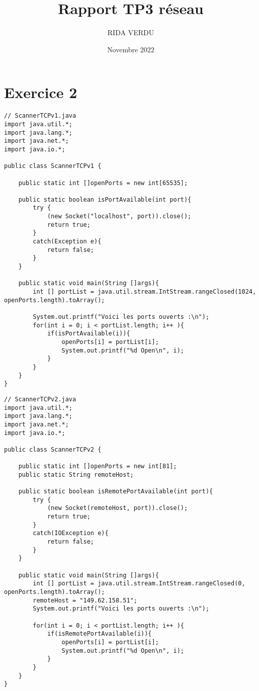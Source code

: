 \documentclass{article}
\title{Rapport TP3 réseau}
\author{RIDA VERDU}
\date{Novembre 2022}
\begin{document}
\maketitle

\section*{Exercice 2}
\begin{lstlisting}
// ScannerTCPv1.java
import java.util.*;
import java.lang.*;
import java.net.*;
import java.io.*;

public class ScannerTCPv1 {

    public static int []openPorts = new int[65535];

    public static boolean isPortAvailable(int port){
        try {
            (new Socket("localhost", port)).close();
            return true;
        }
        catch(Exception e){
            return false;
        }
    }

    public static void main(String []args){
        int [] portList = java.util.stream.IntStream.rangeClosed(1024, openPorts.length).toArray();

        System.out.printf("Voici les ports ouverts :\n");
        for(int i = 0; i < portList.length; i++ ){
            if(isPortAvailable(i)){
                openPorts[i] = portList[i];
                System.out.printf("%d Open\n", i);
            }
        }
    }
}
\end{lstlisting}
\begin{lstlisting}
// ScannerTCPv2.java
import java.util.*;
import java.lang.*;
import java.net.*;
import java.io.*;

public class ScannerTCPv2 {

    public static int []openPorts = new int[81];
    public static String remoteHost;

    public static boolean isRemotePortAvailable(int port){
        try {
            (new Socket(remoteHost, port)).close();
            return true;
        }
        catch(IOException e){
            return false;
        }
    }

    public static void main(String []args){
        int [] portList = java.util.stream.IntStream.rangeClosed(0, openPorts.length).toArray();
        remoteHost = "149.62.158.51";
        System.out.printf("Voici les ports ouverts :\n");

        for(int i = 0; i < portList.length; i++ ){
            if(isRemotePortAvailable(i)){
                openPorts[i] = portList[i];
                System.out.printf("%d Open\n", i);
            }
        }
    }
}
\end{lstlisting}
\end{document}
